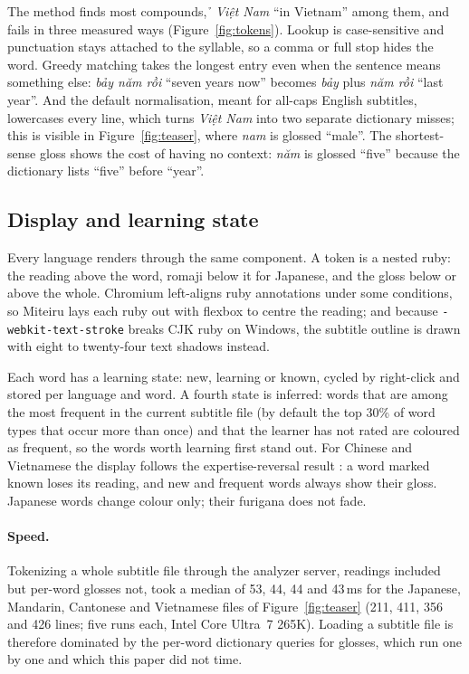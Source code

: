 ﻿\documentclass[11pt,a4paper]{article}
\newcommand{\viet}[1]{{\fontencoding{T5}\selectfont #1}}
\begin{document}
The method finds most compounds, \emph{\viet{\h{\ohorn} Vi\d{\^e}t Nam}} ``in Vietnam'' among them, and fails in three measured ways (Figure~\ref{fig:tokens}). Lookup is case-sensitive and punctuation stays attached to the syllable, so a comma or full stop hides the word. Greedy matching takes the longest entry even when the sentence means something else: \emph{\viet{b\h{a}y n\u{a}m r\`{\^o}i}} ``seven years now'' becomes \emph{\viet{b\h{a}y}} plus \emph{\viet{n\u{a}m r\`{\^o}i}} ``last year''. And the default normalisation, meant for all-caps English subtitles, lowercases every line, which turns \emph{\viet{Vi\d{\^e}t Nam}} into two separate dictionary misses; this is visible in Figure~\ref{fig:teaser}, where \emph{nam} is glossed ``male''. The shortest-sense gloss shows the cost of having no context: \emph{\viet{n\u{a}m}} is glossed ``five'' because the dictionary lists ``five'' before ``year''.

\subsection{Display and learning state}
\label{sec:display}

Every language renders through the same component. A token is a nested ruby: the reading above the word, romaji below it for Japanese, and the gloss below or above the whole. Chromium left-aligns ruby annotations under some conditions, so Miteiru lays each ruby out with flexbox to centre the reading; and because \texttt{-webkit-text-stroke} breaks CJK ruby on Windows, the subtitle outline is drawn with eight to twenty-four text shadows instead.

Each word has a learning state: new, learning or known, cycled by right-click and stored per language and word. A fourth state is inferred: words that are among the most frequent in the current subtitle file (by default the top 30\% of word types that occur more than once) and that the learner has not rated are coloured as frequent, so the words worth learning first stand out. For Chinese and Vietnamese the display follows the expertise-reversal result \citep{lee2011onscreen}: a word marked known loses its reading, and new and frequent words always show their gloss. Japanese words change colour only; their furigana does not fade.

\paragraph{Speed.}
Tokenizing a whole subtitle file through the analyzer server, readings included but per-word glosses not, took a median of 53, 44, 44 and 43\,ms for the Japanese, Mandarin, Cantonese and Vietnamese files of Figure~\ref{fig:teaser} (211, 411, 356 and 426 lines; five runs each, Intel Core Ultra~7 265K). Loading a subtitle file is therefore dominated by the per-word dictionary queries for glosses, which run one by one and which this paper did not time.
\end{document}
